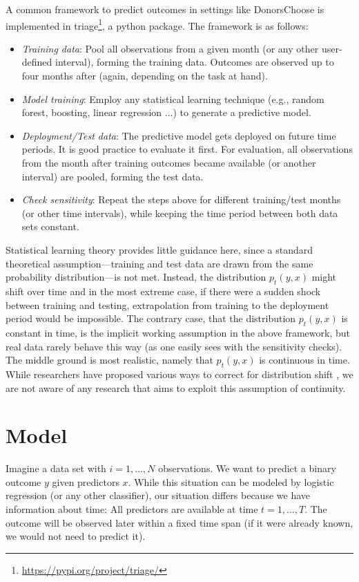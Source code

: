 \documentclass{article}
\begin{document}
A common framework to predict outcomes in settings like DonorsChoose is implemented in triage\footnote{\url{https://pypi.org/project/triage/}}, a python package. The framework is as follows: 
\begin{itemize}
    \item \textit{Training data}: Pool all observations from a given month (or any other user-defined interval), forming the training data. Outcomes are observed up to four months after (again, depending on the task at hand).
    \item \textit{Model training}: Employ any statistical learning technique (e.g., random forest, boosting, linear regression ...) to generate a predictive model.
    \item \textit{Deployment/Test data}: The predictive model gets deployed on future time periods. It is good practice to evaluate it first. For evaluation, all observations from the month after training outcomes became available (or another interval) are pooled, forming the test data.
    \item \textit{Check sensitivity}: Repeat the steps above for different training/test months (or other time intervals), while keeping the time period between both data sets constant.
\end{itemize}
Statistical learning theory provides little guidance here, since a standard theoretical assumption---training and test data are drawn from the same probability distribution---is not met. Instead, the distribution $p_t(y, x)$ might shift over time and in the most extreme case, if there were a sudden shock between training and testing, extrapolation from training to the deployment period would be impossible. The contrary case, that the distribution $p_t(y, x)$ is constant in time, is the implicit working assumption in the above framework, but real data rarely behave this way (as one easily sees with the sensitivity checks). The middle ground is most realistic, namely that $p_t(y, x)$ is continuous in time. While researchers have proposed various ways to correct for distribution shift \citep[e.g.,][p. 133ff.]{varshney_trustworthy_2021}, we are not aware of any research that aims to exploit this assumption of continuity.

\section{Model}\label{sec:model}

Imagine a data set with $i = 1, ..., N$ observations. We want to predict a binary outcome $y$ given predictors $x$. While this situation can be modeled by logistic regression (or any other classifier), our situation differs because we have information about time: All predictors are available at time $t = 1, ..., T$. The outcome will be observed later within a fixed time span (if it were already known, we would not need to predict it). 
\end{document}
